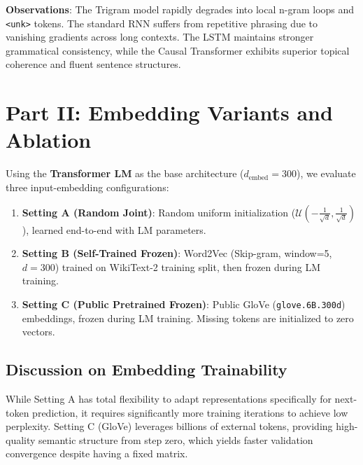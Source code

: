 \documentclass[10pt,twocolumn,3 authorization]{article}
\begin{document}
\textbf{Observations}: The Trigram model rapidly degrades into local n-gram loops and \texttt{<unk>} tokens. The standard RNN suffers from repetitive phrasing due to vanishing gradients across long contexts. The LSTM maintains stronger grammatical consistency, while the Causal Transformer exhibits superior topical coherence and fluent sentence structures.

\section{Part II: Embedding Variants and Ablation}
Using the \textbf{Transformer LM} as the base architecture ($d_{\text{embed}}=300$), we evaluate three input-embedding configurations:
\begin{enumerate}
    \item \textbf{Setting A (Random Joint)}: Random uniform initialization ($\mathcal{U}(-\frac{1}{\sqrt{d}}, \frac{1}{\sqrt{d}})$), learned end-to-end with LM parameters.
    \item \textbf{Setting B (Self-Trained Frozen)}: Word2Vec (Skip-gram, window=5, $d=300$) trained on WikiText-2 training split, then frozen during LM training.
    \item \textbf{Setting C (Public Pretrained Frozen)}: Public GloVe (\texttt{glove.6B.300d}) embeddings, frozen during LM training. Missing tokens are initialized to zero vectors.
\end{enumerate}

\begin{table}[htbp]
\centering
\caption{Part II Input Embedding Ablation Results.}
\label{tab:part2_results}
\end{table}

\subsection{Discussion on Embedding Trainability}
While Setting A has total flexibility to adapt representations specifically for next-token prediction, it requires significantly more training iterations to achieve low perplexity. Setting C (GloVe) leverages billions of external tokens, providing high-quality semantic structure from step zero, which yields faster validation convergence despite having a fixed matrix.
\end{document}

